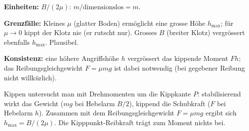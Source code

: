 \begin{kontrolle}
\textbf{Einheiten:} $B/(2\mu)$: $m/\mathrm{dimensionslos}=m$. \checkmark

\textbf{Grenzfälle:} Kleines $\mu$ (glatter Boden) ermöglicht eine grosse
Höhe $h_\mathrm{max}$; für $\mu\to0$ kippt der Klotz nie (er rutscht nur).
Grosses $B$ (breiter Klotz) vergrössert ebenfalls $h_\mathrm{max}$.
Plausibel.

\textbf{Konsistenz:} eine höhere Angriffshöhe $h$ vergrössert
das kippende Moment $Fh$; das Reibungsgleichgewicht $F=\mu mg$ ist dabei
notwendig (bei gegebener Reibung nicht willkürlich).
\end{kontrolle}

\begin{merksatz}
Kippen untersucht man mit Drehmomenten um die Kippkante $P$: stabilisierend
wirkt das Gewicht ($mg$ bei Hebelarm $B/2$), kippend die Schubkraft ($F$ bei
Hebelarm $h$). Zusammen mit dem Reibungsgleichgewicht $F=\mu mg$ ergibt sich
$h_\mathrm{max}=B/(2\mu)$. Die Kipppunkt-Reibkraft trägt zum Moment nichts bei.
\end{merksatz}